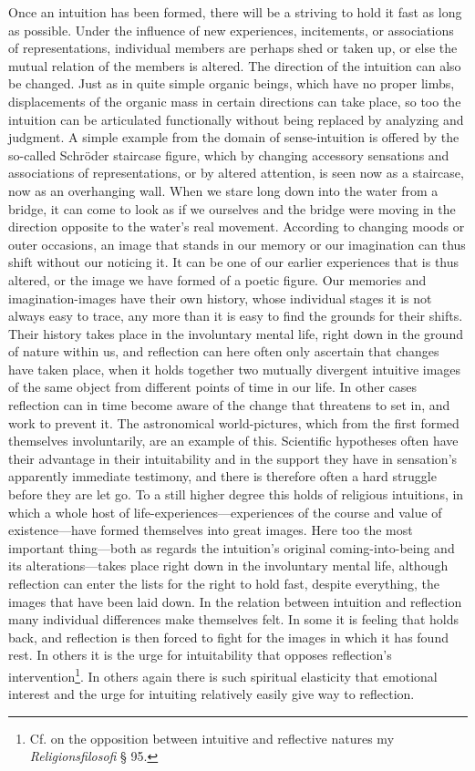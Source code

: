 \documentclass[12pt,a4paper]{book}
\newcommand{\opage}[1]{\marginnote{\footnotesize\textit{[#1]}}}
\begin{document}
Once an intuition has been formed, there will be a striving to hold it
fast as long as possible. Under the influence of new experiences,
incitements, or associations of representations, individual members are
perhaps shed or taken up, or else the mutual relation of the members is
altered. The direction of the intuition can also be changed. Just as in
quite simple organic beings, which have no proper limbs, displacements of
the organic mass in certain directions can take place, so too the
intuition can be articulated functionally without being replaced by
analyzing and judgment. A simple example from the domain of sense-intuition
is offered by the so-called Schröder staircase figure, which by changing
accessory sensations and associations of representations, or by altered
attention, is seen now as a staircase, now as an overhanging wall. When we
stare long down into the water from a bridge, it can come to look as if we
ourselves and the bridge were moving in the direction opposite to the
water's real movement. According to changing moods or outer occasions, an
image that stands in our memory or our imagination can thus shift without
our noticing it. It can be one of our earlier experiences that is thus
altered, or the image we have formed of a poetic figure. Our memories and
imagination-images have their own history, \opage{54}whose individual stages it is
not always easy to trace, any more than it is easy to find the grounds for
their shifts. Their history takes place in the involuntary mental life,
right down in the ground of nature within us, and reflection can here often
only ascertain that changes have taken place, when it holds together two
mutually divergent intuitive images of the same object from different
points of time in our life. In other cases reflection can in time become
aware of the change that threatens to set in, and work to prevent it. The
astronomical world-pictures, which from the first formed themselves
involuntarily, are an example of this. Scientific hypotheses often have
their advantage in their intuitability and in the support they have in
sensation's apparently immediate testimony, and there is therefore often a
hard struggle before they are let go. To a still higher degree this holds
of religious intuitions, in which a whole host of life-experiences---experiences
of the course and value of existence---have formed themselves into great
images. Here too the most important thing---both as regards the intuition's
original coming-into-being and its alterations---takes place right down in
the involuntary mental life, although reflection can enter the lists for
the right to hold fast, despite everything, the images that have been laid
down. In the relation between intuition and reflection many individual
differences make themselves felt. In some it is feeling that holds back,
and reflection is then forced to fight for the images in which it has found
rest. In others it is the urge for intuitability that opposes reflection's
intervention\footnote{Cf. on the opposition between intuitive and
reflective natures my \emph{Religionsfilosofi} § 95.}. In others again
there is such spiritual elasticity that emotional interest and the urge for
intuiting relatively easily give way to reflection.
\end{document}
